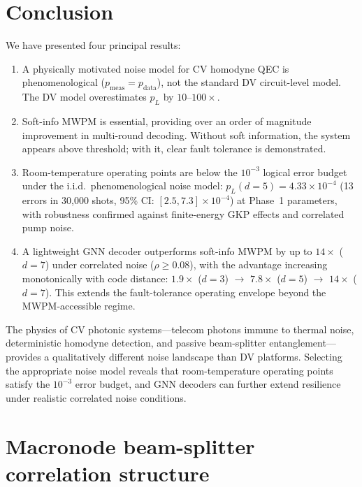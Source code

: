 \documentclass[twocolumn,showpacs,preprintnumbers,amsmath,amssymb,superscriptaddress]{revtex4-2}
\begin{document}
\section{Conclusion}
\label{sec:conclusion}

We have presented four principal results:
\begin{enumerate}
\item A physically motivated noise model for CV homodyne QEC is phenomenological ($p_{\mathrm{meas}} = p_{\mathrm{data}}$), not the standard DV circuit-level model. The DV model overestimates $p_L$ by $10$--$100\times$.
\item Soft-info MWPM is essential, providing over an order of magnitude improvement in multi-round decoding. Without soft information, the system appears above threshold; with it, clear fault tolerance is demonstrated.
\item Room-temperature operating points are below the $10^{-3}$ logical error budget under the i.i.d.\ phenomenological noise model: $p_L(d{=}5) = 4.33 \times 10^{-4}$ (13 errors in 30{,}000 shots, 95\% CI: $[2.5, 7.3] \times 10^{-4}$) at Phase~1 parameters, with robustness confirmed against finite-energy GKP effects and correlated pump noise.
\item A lightweight GNN decoder outperforms soft-info MWPM by up to $14\times$ ($d = 7$) under correlated noise ($\rho \geq 0.08$), with the advantage increasing monotonically with code distance: $1.9\times$ ($d{=}3$) $\to$ $7.8\times$ ($d{=}5$) $\to$ $14\times$ ($d{=}7$). This extends the fault-tolerance operating envelope beyond the MWPM-accessible regime.
\end{enumerate}

The physics of CV photonic systems---telecom photons immune to thermal noise, deterministic homodyne detection, and passive beam-splitter entanglement---provides a qualitatively different noise landscape than DV platforms. Selecting the appropriate noise model reveals that room-temperature operating points satisfy the $10^{-3}$ error budget, and GNN decoders can further extend resilience under realistic correlated noise conditions.

\appendix
\section{Macronode beam-splitter correlation structure}
\label{app:macronode}
\end{document}
